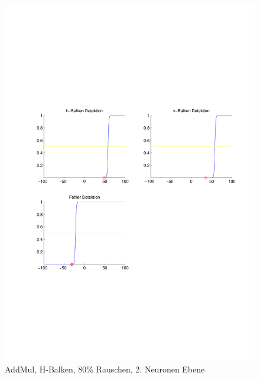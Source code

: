 \begin{figure}[hbt]
\begin{minipage}{0.8 \textwidth}
		\includegraphics[width=\textwidth]{./Bilder/Auswertung/Endergebnis/TypeAddMul_Rauschen80_H_Line_Layer2}
		\caption{AddMul, H-Balken, 80\% Rauschen, 2. Neuronen Ebene}
		\label{AddMul_H_80_2}
	\end{minipage}
\end{figure}
\clearpage

